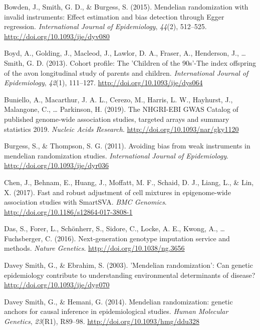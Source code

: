 \documentclass[11pt,twoside]{bristolthesis}
\newlength{\cslhangindent}
\newenvironment{cslreferences}%
  {\setlength{\parindent}{0pt}%
  \everypar{\setlength{\hangindent}{\cslhangindent}}\ignorespaces}%
  {\par}
\begin{document}
\begin{cslreferences}
\leavevmode\hypertarget{ref-Bowden2015}{}%
Bowden, J., Smith, G. D., \& Burgess, S. (2015). Mendelian randomization with invalid instruments: Effect estimation and bias detection through Egger regression. \emph{International Journal of Epidemiology}, \emph{44}(2), 512--525. \url{http://doi.org/10.1093/ije/dyv080}

\leavevmode\hypertarget{ref-Boyd2013}{}%
Boyd, A., Golding, J., Macleod, J., Lawlor, D. A., Fraser, A., Henderson, J., \ldots{} Smith, G. D. (2013). Cohort profile: The 'Children of the 90s'-The index offspring of the avon longitudinal study of parents and children. \emph{International Journal of Epidemiology}, \emph{42}(1), 111--127. \url{http://doi.org/10.1093/ije/dys064}

\leavevmode\hypertarget{ref-Buniello2019}{}%
Buniello, A., Macarthur, J. A. L., Cerezo, M., Harris, L. W., Hayhurst, J., Malangone, C., \ldots{} Parkinson, H. (2019). The NHGRI-EBI GWAS Catalog of published genome-wide association studies, targeted arrays and summary statistics 2019. \emph{Nucleic Acids Research}. \url{http://doi.org/10.1093/nar/gky1120}

\leavevmode\hypertarget{ref-Burgess2011}{}%
Burgess, S., \& Thompson, S. G. (2011). Avoiding bias from weak instruments in mendelian randomization studies. \emph{International Journal of Epidemiology}. \url{http://doi.org/10.1093/ije/dyr036}

\leavevmode\hypertarget{ref-Chen2017}{}%
Chen, J., Behnam, E., Huang, J., Moffatt, M. F., Schaid, D. J., Liang, L., \& Lin, X. (2017). Fast and robust adjustment of cell mixtures in epigenome-wide association studies with SmartSVA. \emph{BMC Genomics}. \url{http://doi.org/10.1186/s12864-017-3808-1}

\leavevmode\hypertarget{ref-Das2016}{}%
Das, S., Forer, L., Schönherr, S., Sidore, C., Locke, A. E., Kwong, A., \ldots{} Fuchsberger, C. (2016). Next-generation genotype imputation service and methods. \emph{Nature Genetics}. \url{http://doi.org/10.1038/ng.3656}

\leavevmode\hypertarget{ref-DaveySmith2003}{}%
Davey Smith, G., \& Ebrahim, S. (2003). 'Mendelian randomization': Can genetic epidemiology contribute to understanding environmental determinants of disease? \url{http://doi.org/10.1093/ije/dyg070}

\leavevmode\hypertarget{ref-DaveySmith2014}{}%
Davey Smith, G., \& Hemani, G. (2014). Mendelian randomization: genetic anchors for causal inference in epidemiological studies. \emph{Human Molecular Genetics}, \emph{23}(R1), R89--98. \url{http://doi.org/10.1093/hmg/ddu328}


\end{cslreferences}
\end{document}
